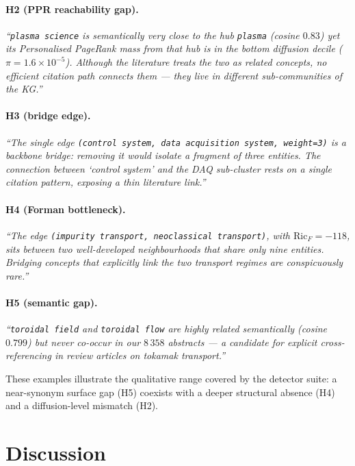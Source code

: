 \documentclass[11pt,a4paper]{article}
\newcommand{\code}[1]{\texttt{\small #1}}
\begin{document}
\paragraph{H2 (PPR reachability gap).} \emph{``\code{plasma science} is semantically very close to the hub \code{plasma} (cosine $0.83$) yet its Personalised PageRank mass from that hub is in the bottom diffusion decile ($\pi=1.6\times 10^{-5}$). Although the literature treats the two as related concepts, no efficient citation path connects them --- they live in different sub-communities of the KG.''}

\paragraph{H3 (bridge edge).} \emph{``The single edge \code{(control system, data acquisition system, weight=3)} is a backbone bridge: removing it would isolate a fragment of three entities. The connection between `control system' and the DAQ sub-cluster rests on a single citation pattern, exposing a thin literature link.''}

\paragraph{H4 (Forman bottleneck).} \emph{``The edge \code{(impurity transport, neoclassical transport)}, with $\mathrm{Ric}_F=-118$, sits between two well-developed neighbourhoods that share only nine entities. Bridging concepts that explicitly link the two transport regimes are conspicuously rare.''}

\paragraph{H5 (semantic gap).} \emph{``\code{toroidal field} and \code{toroidal flow} are highly related semantically (cosine $0.799$) but never co-occur in our $8\,358$ abstracts --- a candidate for explicit cross-referencing in review articles on tokamak transport.''}

These examples illustrate the qualitative range covered by the detector suite: a near-synonym surface gap (H5) coexists with a deeper structural absence (H4) and a diffusion-level mismatch (H2).

\section{Discussion}
\label{sec:discussion}
\end{document}

